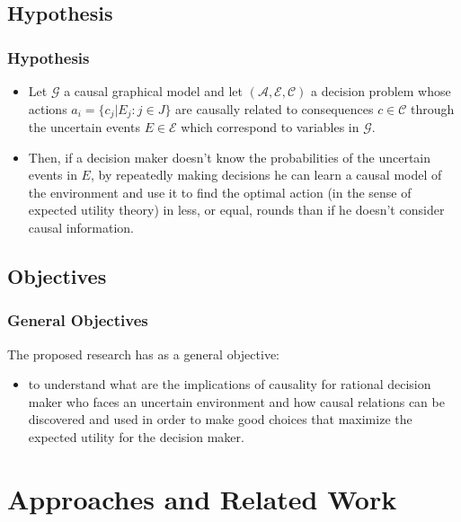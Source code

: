 \documentclass{beamer}
\theoremstyle{plain}
\begin{document}
	\subsection{Hypothesis}
	\begin{frame}
	\frametitle{Hypothesis}
	\begin{itemize}
	\item Let $\mathcal{G}$ a causal graphical model and let $(\mathcal{A},\mathcal{E},\mathcal{C})$ a decision problem whose actions $a_i = \{ c_j | E_j : j \in J \}$  are causally related to consequences $c \in \mathcal{C}$ through the uncertain events $E \in \mathcal{E}$ which correspond to variables in $\mathcal{G}$.
	\item Then, if a decision maker doesn't know the probabilities of the uncertain events in $E$, by repeatedly making decisions he can learn a causal model of the environment and use it to find the optimal action (in the sense of expected utility theory) in less, or equal, rounds than if he doesn't consider causal information.
	\end{itemize}
	\end{frame}
	\subsection{Objectives}
	\begin{frame}
	\frametitle{General Objectives}
	The proposed research has as a general objective:
	\begin{itemize}
 \item to understand what are the implications of causality for rational decision maker who faces an uncertain environment and how causal relations can be discovered and used in order to make good choices that maximize the expected utility for the decision maker.
	\end{itemize}
	\end{frame}

\section{Approaches and Related Work}
\end{document}
